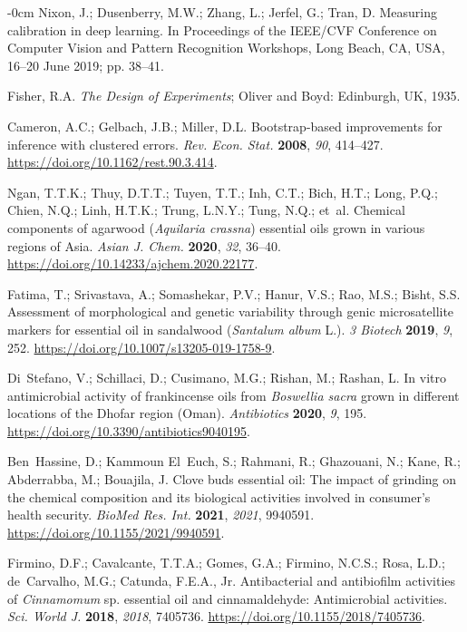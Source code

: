 \documentclass[10pt,a4paper]{article}
\newlength{\extralength}\setlength{\extralength}{3.7cm}
\renewenvironment{thebibliography}[1]{\nolinenumbers\small\list{\arabic{enumiv}.}{\settowidth\labelwidth{999.}\leftmargin\labelwidth\advance\leftmargin\labelsep\usecounter{enumiv}\itemsep 0pt}\sloppy}{\endlist}
\begin{document}
\begin{adjustwidth}{-\extralength}{0cm}
\begin{thebibliography}{999}
 Nixon, J.; Dusenberry, M.W.; Zhang, L.; Jerfel, G.; Tran, D. Measuring calibration in deep learning. In Proceedings of the IEEE/CVF Conference on Computer Vision and Pattern Recognition Workshops, Long Beach, CA, USA, 16--20 June 2019; pp. 38--41.

 Fisher, R.A. \emph{The Design of Experiments}; Oliver and Boyd: Edinburgh, UK, 1935.

 Cameron, A.C.; Gelbach, J.B.; Miller, D.L. Bootstrap-based improvements for inference with clustered errors. \emph{Rev. Econ. Stat.} \textbf{2008}, \emph{90}, 414--427. \url{https://doi.org/10.1162/rest.90.3.414}.

 Ngan, T.T.K.; Thuy, D.T.T.; Tuyen, T.T.; Inh, C.T.; Bich, H.T.; Long, P.Q.; Chien, N.Q.; Linh, H.T.K.; Trung, L.N.Y.; Tung, N.Q.; et~al. Chemical components of agarwood (\emph{Aquilaria crassna}) essential oils grown in various regions of Asia. \emph{Asian J. Chem.} \textbf{2020}, \emph{32}, 36--40. \url{https://doi.org/10.14233/ajchem.2020.22177}.

 Fatima, T.; Srivastava, A.; Somashekar, P.V.; Hanur, V.S.; Rao, M.S.; Bisht, S.S. Assessment of morphological and genetic variability through genic microsatellite markers for essential oil in sandalwood (\emph{Santalum album} L.). \emph{3 Biotech} \textbf{2019}, \emph{9}, 252. \url{https://doi.org/10.1007/s13205-019-1758-9}.

 Di~Stefano, V.; Schillaci, D.; Cusimano, M.G.; Rishan, M.; Rashan, L. In vitro antimicrobial activity of frankincense oils from \emph{Boswellia sacra} grown in different locations of the Dhofar region (Oman). \emph{Antibiotics} \textbf{2020}, \emph{9}, 195. \url{https://doi.org/10.3390/antibiotics9040195}.

 Ben~Hassine, D.; Kammoun El~Euch, S.; Rahmani, R.; Ghazouani, N.; Kane, R.; Abderrabba, M.; Bouajila, J. Clove buds essential oil: The impact of grinding on the chemical composition and its biological activities involved in consumer's health security. \emph{BioMed Res. Int.} \textbf{2021}, \emph{2021}, 9940591. \url{https://doi.org/10.1155/2021/9940591}.

 Firmino, D.F.; Cavalcante, T.T.A.; Gomes, G.A.; Firmino, N.C.S.; Rosa, L.D.; de~Carvalho, M.G.; Catunda, F.E.A., Jr. Antibacterial and antibiofilm activities of \emph{Cinnamomum} sp. essential oil and cinnamaldehyde: Antimicrobial activities. \emph{Sci. World J.} \textbf{2018}, \emph{2018}, 7405736. \url{https://doi.org/10.1155/2018/7405736}.


\end{thebibliography}
\end{adjustwidth}
\end{document}
